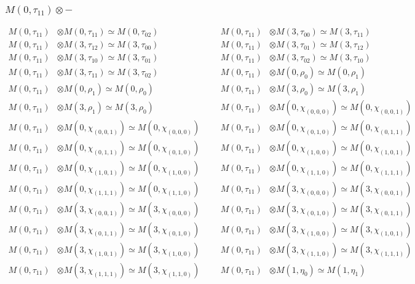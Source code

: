 \subsubsection{$ M(0,\tau_{11})\otimes -$}
\begin{align*}
M(0,\tau_{11}) &\otimes M(0,\tau_{11}) \simeq M(0,\tau_{02}) &&& M(0,\tau_{11}) &\otimes M(3,\tau_{00}) \simeq M(3,\tau_{11})\\
M(0,\tau_{11}) &\otimes M(3,\tau_{12}) \simeq M(3,\tau_{00}) &&& M(0,\tau_{11}) &\otimes M(3,\tau_{01}) \simeq M(3,\tau_{12})\\
M(0,\tau_{11}) &\otimes M(3,\tau_{10}) \simeq M(3,\tau_{01}) &&& M(0,\tau_{11}) &\otimes M(3,\tau_{02}) \simeq M(3,\tau_{10})\\
M(0,\tau_{11}) &\otimes M(3,\tau_{11}) \simeq M(3,\tau_{02}) &&& M(0,\tau_{11}) &\otimes M(0,\rho_{0}) \simeq M(0,\rho_{1})\\
M(0,\tau_{11}) &\otimes M(0,\rho_{1}) \simeq M(0,\rho_{0}) &&& M(0,\tau_{11}) &\otimes M(3,\rho_{0}) \simeq M(3,\rho_{1})\\
M(0,\tau_{11}) &\otimes M(3,\rho_{1}) \simeq M(3,\rho_{0}) &&& M(0,\tau_{11}) &\otimes M(0,\chi_{(0,0,0)}) \simeq M(0,\chi_{(0,0,1)})\\
M(0,\tau_{11}) &\otimes M(0,\chi_{(0,0,1)}) \simeq M(0,\chi_{(0,0,0)}) &&& M(0,\tau_{11}) &\otimes M(0,\chi_{(0,1,0)}) \simeq M(0,\chi_{(0,1,1)})\\
M(0,\tau_{11}) &\otimes M(0,\chi_{(0,1,1)}) \simeq M(0,\chi_{(0,1,0)}) &&& M(0,\tau_{11}) &\otimes M(0,\chi_{(1,0,0)}) \simeq M(0,\chi_{(1,0,1)})\\
M(0,\tau_{11}) &\otimes M(0,\chi_{(1,0,1)}) \simeq M(0,\chi_{(1,0,0)}) &&& M(0,\tau_{11}) &\otimes M(0,\chi_{(1,1,0)}) \simeq M(0,\chi_{(1,1,1)})\\
M(0,\tau_{11}) &\otimes M(0,\chi_{(1,1,1)}) \simeq M(0,\chi_{(1,1,0)}) &&& M(0,\tau_{11}) &\otimes M(3,\chi_{(0,0,0)}) \simeq M(3,\chi_{(0,0,1)})\\
M(0,\tau_{11}) &\otimes M(3,\chi_{(0,0,1)}) \simeq M(3,\chi_{(0,0,0)}) &&& M(0,\tau_{11}) &\otimes M(3,\chi_{(0,1,0)}) \simeq M(3,\chi_{(0,1,1)})\\
M(0,\tau_{11}) &\otimes M(3,\chi_{(0,1,1)}) \simeq M(3,\chi_{(0,1,0)}) &&& M(0,\tau_{11}) &\otimes M(3,\chi_{(1,0,0)}) \simeq M(3,\chi_{(1,0,1)})\\
M(0,\tau_{11}) &\otimes M(3,\chi_{(1,0,1)}) \simeq M(3,\chi_{(1,0,0)}) &&& M(0,\tau_{11}) &\otimes M(3,\chi_{(1,1,0)}) \simeq M(3,\chi_{(1,1,1)})\\
M(0,\tau_{11}) &\otimes M(3,\chi_{(1,1,1)}) \simeq M(3,\chi_{(1,1,0)}) &&& M(0,\tau_{11}) &\otimes M(1,\eta_{0}) \simeq M(1,\eta_{1})\\

\end{align*}
